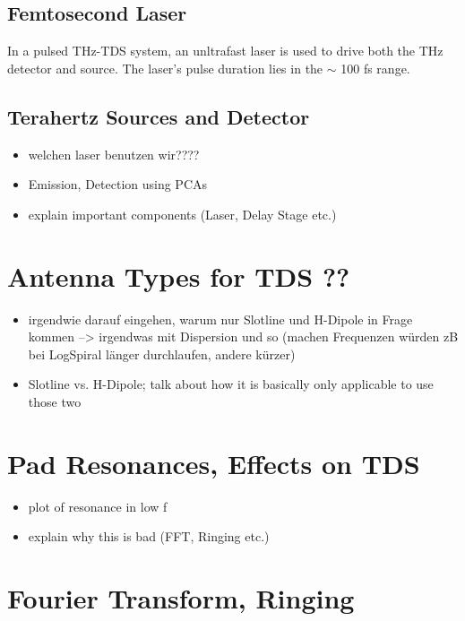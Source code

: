 \documentclass[
	german,%
	accentcolor=9c,%
	ruledheaders=section,%
	class=report,%
	thesis={type=bachelor},%
	fontsize=11pt,%
	parskip=half-,%
	custommargins=false,%
	marginpar=false,%
	BCOR=5mm,%
 	logofile=tools/logo-installation/TUDa-logos/tuda_logo.png,%
]{tudapub}
\begin{document}
\subsection{Femtosecond Laser}
In a pulsed THz-TDS system, an unltrafast laser is used to drive both the THz detector and source. The laser's pulse duration lies in the $\sim$ \num{100} \si{\femto\s} range. 

\subsection{Terahertz Sources and Detector}

\begin{itemize}
	\item welchen laser benutzen wir????
\end{itemize}

\begin{itemize}
	\item Emission, Detection using PCAs 
	\item explain important components (Laser, Delay Stage etc.)
\end{itemize}

\section{Antenna Types for TDS ??}
\begin{itemize}
	\item irgendwie darauf eingehen, warum nur Slotline und H-Dipole in Frage kommen
	--> irgendwas mit Dispersion und so (machen Frequenzen würden zB bei LogSpiral länger durchlaufen, andere kürzer) 
\end{itemize}
\begin{itemize}
	\item Slotline vs. H-Dipole; talk about how it is basically only
	applicable to use those two 
\end{itemize}

\section{Pad Resonances, Effects on TDS}
\begin{itemize}
	\item plot of resonance in low f 
	\item explain why this is bad (FFT, Ringing etc.)
\end{itemize}
\section{Fourier Transform, Ringing}
\end{document}
